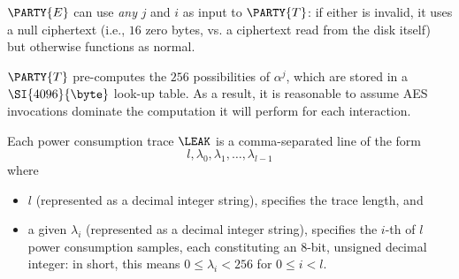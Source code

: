 \begin{itemize}
{      \noindent
      $\PARTY{E}$ can use {\em any} $j$ and $i$ as input to $\PARTY{T}$: if 
      either is invalid, it uses a null ciphertext (i.e., $16$ zero bytes, 
      vs. a ciphertext read from the disk itself) but otherwise functions 
      as normal.
\item $\PARTY{T}$ pre-computes the $256$ possibilities of $\alpha^j$, which 
      are stored in a $\SI{4096}{\byte}$ look-up table.  As a result, it is 
      reasonable to assume AES invocations dominate the computation it will
      perform for each interaction.
}{}%
\item Each power consumption trace $\LEAK$ is a comma-separated line of the 
      form
      \[
      l, \lambda_0, \lambda_1, \ldots, \lambda_{l-1}
      \]
      where
         
      \begin{itemize}
      \item $l$
            (represented as a                       decimal integer string),
            specifies the trace length, 
            and
      \item a given $\lambda_i$ 
            (represented as a                       decimal integer string),
            specifies the $i$-th of $l$ power consumption samples, each 
            constituting an $8$-bit, unsigned decimal integer: in short, 
            this means $0 \leq \lambda_i < 256$ for $0 \leq i < l$.
      \end{itemize}

\end{itemize}


